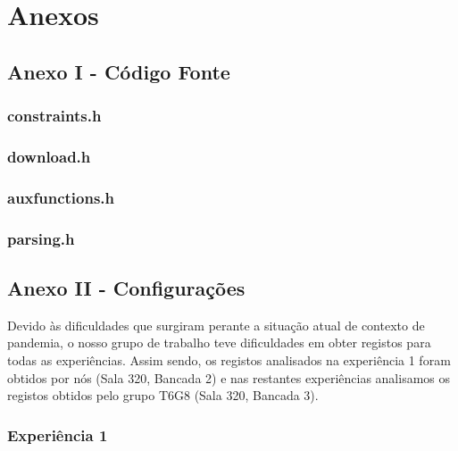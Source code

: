 \documentclass[article, a4paper, 11pt, oneside]{memoir}
\begin{document}
\chapter[Anexos][Anexos]{Anexos} \label{\thechapter}

\section{Anexo I - Código Fonte}

\subsection{constraints.h}



\subsection{download.h}

   

\subsection{auxfunctions.h}



\subsection{parsing.h}



\newpage

\section{Anexo II - Configurações}


Devido às dificuldades que surgiram perante a situação atual de contexto de pandemia, o nosso
grupo de trabalho teve dificuldades em obter registos para todas as experiências. Assim sendo,
os registos analisados na experiência 1 foram obtidos por nós (Sala 320, Bancada 2) e nas 
restantes experiências analisamos os registos obtidos pelo grupo T6G8 (Sala 320, Bancada 3).

\subsection{Experiência 1} \label{exp1-conf}
\end{document}
